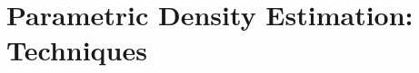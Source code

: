 \chapter{Parametric Density Estimation: Techniques}
\begin{refsection}
%
\printbibliography[heading=subbibliography]
\end{refsection}